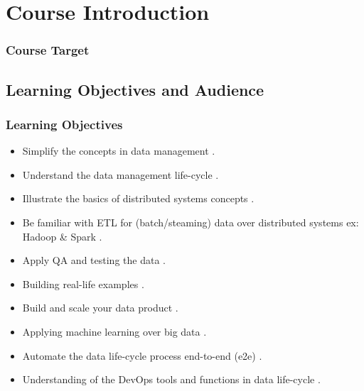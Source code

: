 \section{Course Introduction}

\begin{frame}
\frametitle{Course Target}
\scalebox{0.9}
{
	\begin{adjustbox}{max totalsize={.9\textheight},center}
	\end{adjustbox}
}
\end{frame}

\subsection{Learning Objectives and Audience}
\begin{frame}
\frametitle{Learning Objectives}

\begin{itemize}[<+->]
	\item Simplify the concepts in data management .
	\item Understand the data management life-cycle . 
	\item Illustrate the basics of distributed systems concepts .
	\item Be familiar with ETL for (batch/steaming) data over distributed systems ex: Hadoop \& Spark .  
	\item Apply QA and testing the data .
	\item Building real-life examples . 
	\item Build and scale your data product .    
	\item Applying machine learning over big data . 
	\item Automate the data life-cycle process end-to-end (e2e) . 
	\item Understanding of the DevOps tools and functions in data life-cycle .
\end{itemize}

\end{frame}

